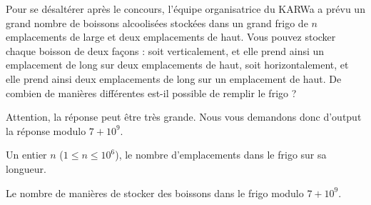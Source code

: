 \problemname{\problemyamlname}


Pour se désaltérer après le concours, l'équipe organisatrice du KARWa a prévu un grand
nombre de boissons alcoolisées stockées dans un grand frigo de $n$ emplacements
de large et deux emplacements de haut. Vous pouvez stocker chaque boisson de
deux façons : soit verticalement, et elle prend ainsi un emplacement de long sur
deux emplacements de haut, soit horizontalement, et elle prend ainsi deux
emplacements de long sur un emplacement de haut. De combien de manières
différentes est-il possible de remplir le frigo ?

Attention, la réponse peut être très grande. Nous vous demandons donc d'output
la réponse modulo $7+10^9$.

\begin{Input}
	Un entier $n$ ($1 \le n \le 10^{6}$), le nombre d'emplacements dans le frigo sur sa longueur.
\end{Input}

\begin{Output}
	Le nombre de manières de stocker des boissons dans le frigo modulo $7+10^9$.
\end{Output}

